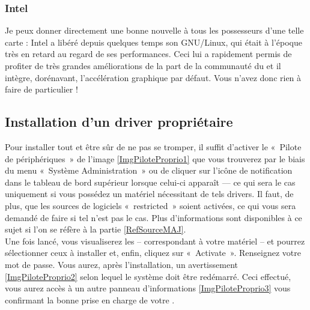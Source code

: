 \subsubsection{Intel}
Je peux donner directement une bonne nouvelle à tous les possesseurs d'une telle carte : Intel a libéré depuis quelques temps son  GNU/Linux, qui était à l'époque très en retard au regard de ses performances. Ceci lui a rapidement permis de profiter de très grandes améliorations de la part de la communauté du  et il intègre, dorénavant, l'accélération graphique par défaut. Vous n'avez donc rien à faire de particulier !
\subsection{Installation d'un driver propriétaire}
\label{RefInstallDriverProprietaire}
Pour installer tout   et être sûr de ne pas se tromper, il suffit d'activer le «~Pilote de périphériques~» de l'image \ref{ImgPiloteProprio1} que vous trouverez par le biais du menu «~Système \FlecheDroite Administration~» ou de cliquer sur l'icône de notification dans le tableau de bord supérieur lorsque celui-ci apparaît --- ce qui sera le cas uniquement si vous possédez un matériel nécessitant de tels drivers. Il faut, de plus, que les sources de logiciels «~restricted~» soient activées, ce qui vous sera demandé de faire si tel n'est pas le cas. Plus d'informations sont disponibles à ce sujet si l'on se réfère à la partie \ref{RefSourceMAJ}.\\
Une fois lancé, vous visualiserez les   -- correspondant à votre matériel -- et pourrez sélectionner ceux à installer et, enfin, cliquez sur «~Activate~». Renseignez votre mot de passe. Vous aurez, après l'installation, un avertissement \ref{ImgPiloteProprio2} selon lequel le système doit être redémarré. Ceci effectué, vous aurez accès à un autre panneau d'informations \ref{ImgPiloteProprio3} vous confirmant la bonne prise en charge de votre  .
\PiloteProprio
